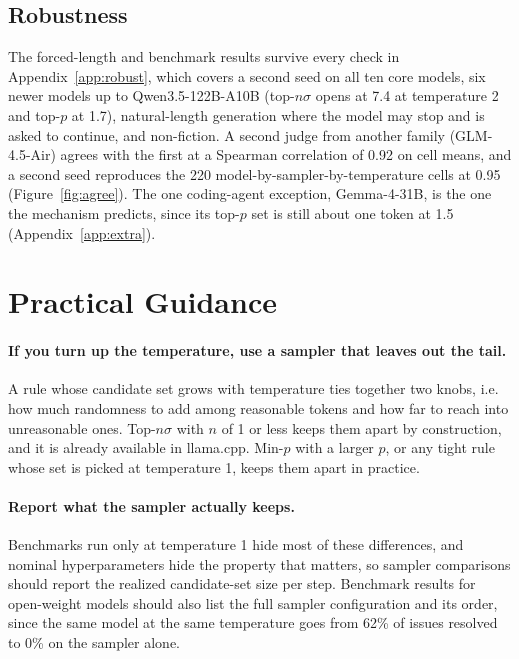 \documentclass{article}
\begin{document}
\subsection{Robustness}
\label{sec:robust}

The forced-length and benchmark results survive every check in Appendix~\ref{app:robust}, which covers a second seed on all ten core models, six newer models up to Qwen3.5-122B-A10B (top-$n\sigma$ opens at 7.4 at temperature 2 and top-$p$ at 1.7), natural-length generation where the model may stop and is asked to continue, and non-fiction. A second judge from another family (GLM-4.5-Air) agrees with the first at a Spearman correlation of 0.92 on cell means, and a second seed reproduces the 220 model-by-sampler-by-temperature cells at 0.95 (Figure~\ref{fig:agree}). The one coding-agent exception, Gemma-4-31B, is the one the mechanism predicts, since its top-$p$ set is still about one token at 1.5 (Appendix~\ref{app:extra}).

\section{Practical Guidance}
\label{sec:discussion}

\paragraph{If you turn up the temperature, use a sampler that leaves out the tail.}
A rule whose candidate set grows with temperature ties together two knobs, i.e. how much randomness to add among reasonable tokens and how far to reach into unreasonable ones. Top-$n\sigma$ with $n$ of 1 or less keeps them apart by construction, and it is already available in llama.cpp. Min-$p$ with a larger $p$, or any tight rule whose set is picked at temperature 1, keeps them apart in practice.

\paragraph{Report what the sampler actually keeps.}
Benchmarks run only at temperature 1 hide most of these differences, and nominal hyperparameters hide the property that matters, so sampler comparisons should report the realized candidate-set size per step. Benchmark results for open-weight models should also list the full sampler configuration and its order, since the same model at the same temperature goes from 62\% of issues resolved to 0\% on the sampler alone.
\end{document}
